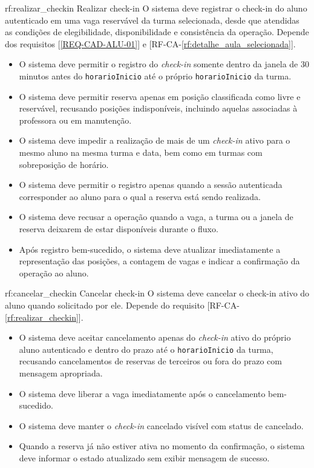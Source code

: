 \reqfunc
{rf:realizar_checkin}
{Realizar check-in}
{O sistema deve registrar o check-in do aluno autenticado em uma vaga reservável da turma selecionada, desde que atendidas as condições de elegibilidade, disponibilidade e consistência da operação.}
{Depende dos requisitos [\ref{REQ-CAD-ALU-01}] e [RF-CA-\ref{rf:detalhe_aula_selecionada}].}
{\begin{itemize}[leftmargin=0.6cm]
    \item O sistema deve permitir o registro do \textit{check-in} somente dentro da janela de 30 minutos antes do \texttt{horarioInicio} até o próprio \texttt{horarioInicio} da turma.
    \item O sistema deve permitir reserva apenas em posição classificada como livre e reservável, recusando posições indisponíveis, incluindo aquelas associadas à professora ou em manutenção.
    \item O sistema deve impedir a realização de mais de um \textit{check-in} ativo para o mesmo aluno na mesma turma e data, bem como em turmas com sobreposição de horário.
    \item O sistema deve permitir o registro apenas quando a sessão autenticada corresponder ao aluno para o qual a reserva está sendo realizada.
    \item O sistema deve recusar a operação quando a vaga, a turma ou a janela de reserva deixarem de estar disponíveis durante o fluxo.
    \item Após registro bem-sucedido, o sistema deve atualizar imediatamente a representação das posições, a contagem de vagas e indicar a confirmação da operação ao aluno.
\end{itemize}}

\reqfunc
{rf:cancelar_checkin}
{Cancelar check-in}
{O sistema deve cancelar o check-in ativo do aluno quando solicitado por ele.}
{Depende do requisito [RF-CA-\ref{rf:realizar_checkin}].}
{\begin{itemize}[leftmargin=0.6cm]
    \item O sistema deve aceitar cancelamento apenas do \textit{check-in} ativo do próprio aluno autenticado e dentro do prazo até o \texttt{horarioInicio} da turma, recusando cancelamentos de reservas de terceiros ou fora do prazo com mensagem apropriada.
    \item O sistema deve liberar a vaga imediatamente após o cancelamento bem-sucedido.
    \item O sistema deve manter o \textit{check-in} cancelado visível com status de cancelado.
    \item Quando a reserva já não estiver ativa no momento da confirmação, o sistema deve informar o estado atualizado sem exibir mensagem de sucesso.
\end{itemize}}

